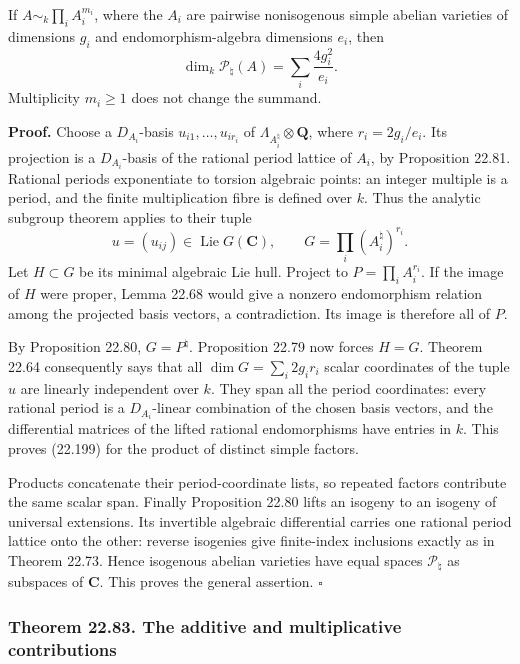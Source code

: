 \documentclass[
  11pt,
  a4paper,
]{article}
\begin{document}
If \(A\sim_k\prod_i A_i^{m_i}\), where the \(A_i\) are pairwise
nonisogenous simple abelian varieties of dimensions \(g_i\) and
endomorphism-algebra dimensions \(e_i\), then \[
 \dim_k\mathcal P_\natural(A)=
       \sum_i\frac{4g_i^2}{e_i}.
 \tag{22.199}
\] Multiplicity \(m_i\ge1\) does not change the summand.

\textbf{Proof.} Choose a \(D_{A_i}\)-basis \(u_{i1},\ldots,u_{ir_i}\) of
\(\Lambda_{A_i^\natural}\otimes\mathbf Q\), where \(r_i=2g_i/e_i\). Its
projection is a \(D_{A_i}\)-basis of the rational period lattice of
\(A_i\), by Proposition 22.81. Rational periods exponentiate to torsion
algebraic points: an integer multiple is a period, and the finite
multiplication fibre is defined over \(k\). Thus the analytic subgroup
theorem applies to their tuple \[
 u=(u_{ij})\in
 \operatorname{Lie}G(\mathbf C),\qquad
 G=\prod_i(A_i^\natural)^{r_i}.
 \tag{22.200}
\] Let \(H\subset G\) be its minimal algebraic Lie hull. Project to
\(P=\prod_i A_i^{r_i}\). If the image of \(H\) were proper, Lemma 22.68
would give a nonzero endomorphism relation among the projected basis
vectors, a contradiction. Its image is therefore all of \(P\).

By Proposition 22.80, \(G=P^\natural\). Proposition 22.79 now forces
\(H=G\). Theorem 22.64 consequently says that all
\(\dim G=\sum_i2g_i r_i\) scalar coordinates of the tuple \(u\) are
linearly independent over \(k\). They span all the period coordinates:
every rational period is a \(D_{A_i}\)-linear combination of the chosen
basis vectors, and the differential matrices of the lifted rational
endomorphisms have entries in \(k\). This proves (22.199) for the
product of distinct simple factors.

Products concatenate their period-coordinate lists, so repeated factors
contribute the same scalar span. Finally Proposition 22.80 lifts an
isogeny to an isogeny of universal extensions. Its invertible algebraic
differential carries one rational period lattice onto the other: reverse
isogenies give finite-index inclusions exactly as in Theorem 22.73.
Hence isogenous abelian varieties have equal spaces
\(\mathcal P_\natural\) as subspaces of \(\mathbf C\). This proves the
general assertion. \(\square\)

\subsubsection{Theorem 22.83. The additive and multiplicative
contributions}\label{theorem-22.83.-the-additive-and-multiplicative-contributions}
\end{document}
